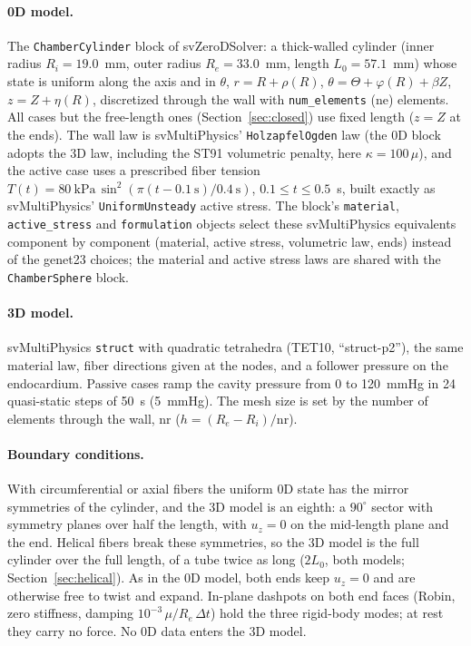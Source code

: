 \paragraph{0D model.} The \texttt{ChamberCylinder} block of svZeroDSolver: a thick-walled
cylinder (inner radius $R_i = 19.0$~mm, outer radius $R_e = 33.0$~mm, length
$L_0 = 57.1$~mm) whose state is uniform along the axis and in $\theta$,
$r = R + \rho(R)$, $\theta = \Theta + \varphi(R) + \beta Z$, $z = Z + \eta(R)$,
discretized through the wall with \texttt{num\_elements} (ne) elements. All cases but the
free-length ones (Section~\ref{sec:closed}) use fixed length ($z = Z$ at the ends). The wall law is svMultiPhysics' \texttt{HolzapfelOgden} law
(the 0D block adopts the 3D law, including the ST91 volumetric penalty, here
$\kappa = 100\,\mu$), and the active case uses a prescribed fiber tension
$T(t) = 80~\mathrm{kPa}\,\sin^2(\pi(t-0.1~\mathrm{s})/0.4~\mathrm{s})$, $0.1 \le t \le 0.5$~s,
built exactly as svMultiPhysics' \texttt{UniformUnsteady} active stress. The block's
\texttt{material}, \texttt{active\_stress} and \texttt{formulation} objects select these
svMultiPhysics equivalents component by component (material, active stress, volumetric
law, ends) instead of the genet23 choices; the material and active stress laws are
shared with the \texttt{ChamberSphere} block.

\paragraph{3D model.} svMultiPhysics \texttt{struct} with quadratic tetrahedra (TET10,
``struct-p2''), the same material law, fiber directions given at the nodes, and a
follower pressure on the endocardium. Passive cases ramp the cavity pressure from 0 to
120~mmHg in 24 quasi-static steps of 50~s (5~mmHg). The mesh size is set by the number
of elements through the wall, nr ($h = (R_e - R_i)/\mathrm{nr}$).

\paragraph{Boundary conditions.} With circumferential or axial fibers the uniform 0D
state has the mirror symmetries of the cylinder, and the 3D model is an eighth: a
$90^\circ$ sector with symmetry planes over half the length, with $u_z = 0$ on the
mid-length plane and the end. Helical fibers break these symmetries, so the 3D model is
the full cylinder over the full length, of a tube twice as long ($2L_0$, both models;
Section~\ref{sec:helical}). As in the 0D model, both ends keep $u_z = 0$
and are otherwise free to twist and expand. In-plane dashpots on both end faces
(Robin, zero stiffness, damping $10^{-3}\,\mu/R_e\,\Delta t$) hold the three rigid-body
modes; at rest they carry no force. No 0D data enters the 3D model.

